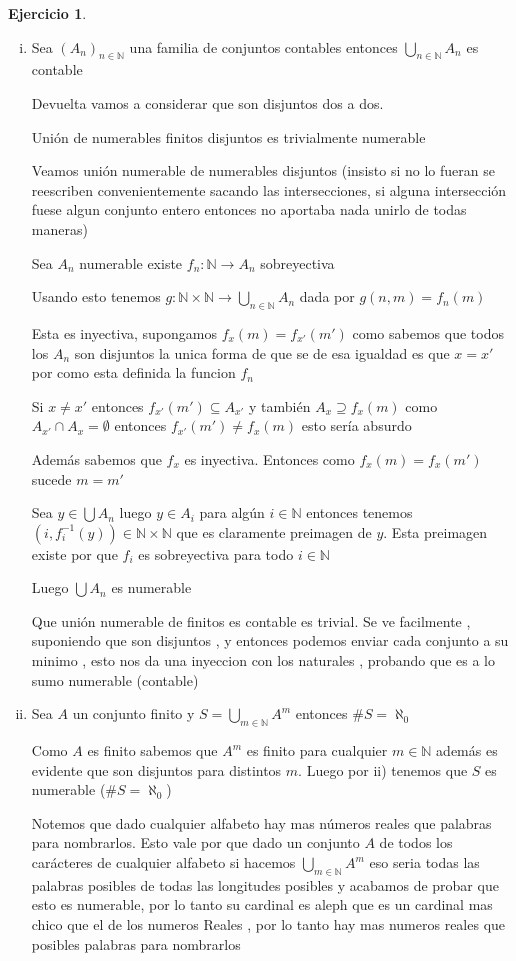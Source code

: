 \documentclass[12pt]{article}
\newcommand{\n}{\aleph_{0}}
\newcommand{\N}{\mathbb{N}}
\newcommand{\ra}{\rightarrow}
\theoremstyle{definition}
\newtheorem{ej}{Ejercicio}
\begin{document}
\begin{ej}
\begin{enumerate}[i.]
    


  \item Sea $(A_{n})_{n \in \N}$ una familia de conjuntos contables entonces $\bigcup_{n \in \N} A_{n}$ es contable
  
    Devuelta vamos a considerar que son disjuntos dos a dos.

    Unión de numerables finitos disjuntos es trivialmente numerable

    Veamos unión numerable de numerables disjuntos (insisto si no lo fueran se reescriben convenientemente sacando las intersecciones, si alguna intersección fuese algun conjunto entero entonces no aportaba nada unirlo de todas maneras)

    Sea $A_{n}$ numerable existe $f_{n}: \N \ra A_{n}$ sobreyectiva

    Usando esto tenemos $g: \N \times \N \ra \bigcup_{n \in \N} A_{n}$ dada por $g(n,m) = f_{n}(m)$

    Esta es inyectiva, supongamos $f_x(m) = f_{x '}(m')$ como sabemos que todos los $A_n$ son disjuntos la unica forma de que se de esa igualdad es que $x = x '$ por como esta definida la funcion $f_n$

    Si $x\neq x'$ entonces $f_{x'}(m') \subseteq A_{x'}$ y también $A_{x} \supseteq f_{x}(m) $ como $ A_{x'} \cap A_{x} = \emptyset $ entonces $f_{x'}(m') \neq f_x(m)$ esto sería absurdo

    Además sabemos que $f_x$ es inyectiva. Entonces como $f_x(m) = f_{x}(m')$ sucede $m = m'$ 


    Sea $y \in \bigcup A_{n}$ luego $y \in A_{i}$ para algún $i \in \N$ entonces tenemos $(i ,f^{-1}_{i} (y)) \in \N \times \N$ que es claramente preimagen de $y$. Esta preimagen existe por que $f_i$ es sobreyectiva para todo $i \in \N$

    Luego $\bigcup A_{n}$ es numerable

    Que unión numerable de finitos es contable es trivial. Se ve facilmente , suponiendo que son disjuntos , y entonces podemos enviar cada conjunto a su minimo , esto nos da una inyeccion con los naturales , probando que es a lo sumo numerable (contable)

  \item Sea $A$ un conjunto finito y $S = \bigcup_{m \in \N} A^{m}$ entonces $\# S = \n$  

  Como $A$ es finito sabemos que $A^m$ es finito para cualquier $m \in \N$ además es evidente que son disjuntos para distintos $m$. Luego por ii) tenemos que $S$ es numerable ($\# S = \n$)

Notemos que dado cualquier alfabeto hay mas números reales que palabras para nombrarlos. Esto vale por que dado un conjunto $A$ de todos los carácteres de cualquier alfabeto si hacemos $\bigcup_{m \in \N}A^{m}$ eso seria todas las palabras posibles de todas las longitudes posibles y acabamos de probar que esto es numerable, por lo tanto su cardinal es aleph que es un cardinal mas chico que el de los numeros Reales , por lo tanto hay mas numeros reales que posibles palabras para nombrarlos
\end{enumerate}
\end{ej}
\end{document}
